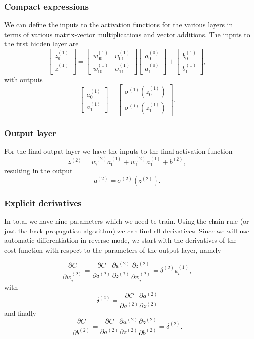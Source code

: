 \documentclass{beamer}
\begin{document}
\begin{frame}
\frametitle{Compact expressions}

We can define the inputs to the activation functions for the various layers in terms of various matrix-vector multiplications and vector additions.
The inputs to the first hidden layer are
\[
\begin{bmatrix}z_0^{(1)} \\ z_1^{(1)} \end{bmatrix}=\begin{bmatrix}w_{00}^{(1)} & w_{01}^{(1)}\\ w_{10}^{(1)} &w_{11}^{(1)} \end{bmatrix}\begin{bmatrix}a_0^{(0)} \\ a_1^{(0)} \end{bmatrix}+\begin{bmatrix}b_0^{(1)} \\ b_1^{(1)} \end{bmatrix},
\]
with outputs
\[
\begin{bmatrix}a_0^{(1)} \\ a_1^{(1)} \end{bmatrix}=\begin{bmatrix}\sigma^{(1)}(z_0^{(1)}) \\ \sigma^{(1)}(z_1^{(1)}) \end{bmatrix}.
\]
\end{frame}

\begin{frame}
\frametitle{Output layer}

For the final output layer we have the inputs to the final activation function 
\[
z^{(2)} = w_{0}^{(2)}a_0^{(1)} +w_{1}^{(2)}a_1^{(1)}+b^{(2)},
\]
resulting in the  output
\[
a^{(2)}=\sigma^{(2)}(z^{(2)}).
\]
\end{frame}

\begin{frame}
\frametitle{Explicit derivatives}

In total we have nine parameters which we need to train.  Using the
chain rule (or just the back-propagation algorithm) we can find all
derivatives. Since we will use automatic differentiation in reverse
mode, we start with the derivatives of the cost function with respect
to the parameters of the output layer, namely

\[
\frac{\partial C}{\partial w_{i}^{(2)}}=\frac{\partial C}{\partial a^{(2)}}\frac{\partial a^{(2)}}{\partial z^{(2)}}\frac{\partial z^{(2)}}{\partial w_{i}^{(2)}}=\delta^{(2)}a_i^{(1)},
\]
with
\[
\delta^{(2)}=\frac{\partial C}{\partial a^{(2)}}\frac{\partial a^{(2)}}{\partial z^{(2)}}
\]
and finally
\[
\frac{\partial C}{\partial b^{(2)}}=\frac{\partial C}{\partial a^{(2)}}\frac{\partial a^{(2)}}{\partial z^{(2)}}\frac{\partial z^{(2)}}{\partial b^{(2)}}=\delta^{(2)}.
\]
\end{frame}
\end{document}
